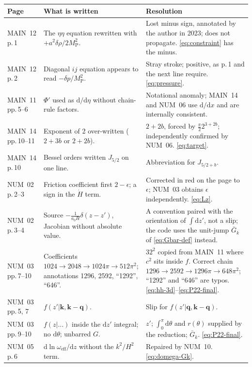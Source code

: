 \documentclass[11pt,a4paper]{article}
\newcommand{\MP}{M_{\mathrm{P}}}
\newcommand{\dd}{\mathrm{d}}
\newcommand{\vk}{\mathbf{k}}
\newcommand{\vq}{\mathbf{q}}
\newcommand{\Gb}{\bar{G}}
\newcommand{\om}{\omega_{\mathrm{eff}}}
\newcommand{\eps}{\epsilon}
\newcommand{\note}[1]{\textsf{#1}}
\theoremstyle{remark}
\begin{document}
\begin{longtable}{p{2.6cm}p{5.4cm}p{6.8cm}}
\toprule
Page & What is written & Resolution \\
\midrule
\note{MAIN}~12 p.\,1 & The $\eta\eta$ equation rewritten with $+a^2\delta\rho/2\MP^2$. & Lost minus sign, annotated by the author in 2023; does not propagate. \eqref{eq:constraint} has the minus. \\
\note{MAIN}~12 p.\,2 & Diagonal $ij$ equation appears to read $-\delta p/\MP^2$. & Stray stroke; positive, as p.\,1 and the next line require. \eqref{eq:pressure}. \\
\note{MAIN}~11 pp.\,5--6 & $\Phi'$ used as $\dd/\dd\eta$ without chain-rule factors. & Notational anomaly; \note{MAIN}~14 and \note{NUM}~06 use $\dd/\dd x$ and are internally consistent. \\
\note{MAIN}~14 pp.\,10--11 & Exponent of 2 over-written ($2+3b$ or $2+2b$). & $2+2b$, forced by $\tfrac{\pi}{2}2^{3+2b}$; independently confirmed by \note{NUM}~06. \eqref{eq:target}. \\
\note{MAIN}~14 p.\,10 & Bessel orders written $J_{5/2}$ on one line. & Abbreviation for $J_{5/2+b}$. \\
\note{NUM}~02 p.\,2--3 & Friction coefficient first $2-\eps$; a sign in the $\dot H$ term. & Corrected in red on the page to $\eps$; \note{NUM}~03 obtains $\eps$ independently. \eqref{eq:Lz}. \\
\note{NUM}~02 p.\,3--4 & Source $-\frac{1}{a_0H}\delta(z-z')$, Jacobian without absolute value. & A convention paired with the orientation of $\int\dd z'$, not a slip; the code uses the unit-jump $\Gb_k$ of \eqref{eq:Gbar-def} instead. \\
\note{NUM}~03 pp.\,7--10 & Coefficients $1024\to2048\to1024\pi\to512\pi^2$; annotations 1296, 2592, ``1292'', ``646''. & $32^2$ copied from \note{MAIN}~11 where $c^2$ sits inside $f$. Correct chain $1296\to2592\to1296\pi\to648\pi^2$; ``1292'' and ``646'' are typos. \eqref{eq:hh-3d}--\eqref{eq:P22-final}. \\
\note{NUM}~03 pp.\,5, 7 & $f(z'|\vk,\vk-\vq)$. & Slip for $f(z'|\vq,\vk-\vq)$. \\
\note{NUM}~03 pp.\,9--10 & $f(z|\ldots)$ inside the $\dd z'$ integral; no $\dd\theta$; unbarred $G$. & $z'$; $\int_0^\pi\dd\theta$ and $r(\theta)$ supplied by the reduction; $\Gb_k$. \eqref{eq:P22-final}. \\
\note{NUM}~05 p.\,6 & $\dd\ln\om/\dd z$ without the $k^2/H^2$ term. & Repaired by \note{NUM}~10. \eqref{eq:domega-Gk}. \\

\end{longtable}
\end{document}
